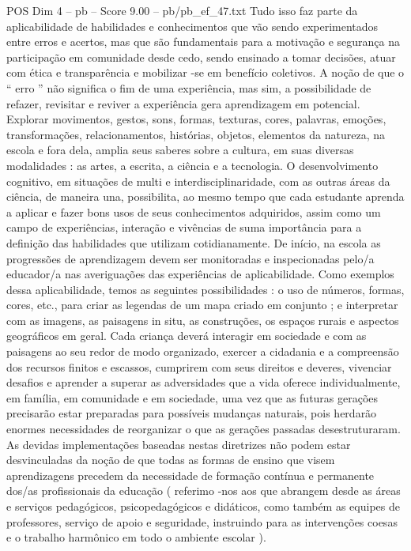 \begin{textsample}{POS Dim 4 – pb – Score 9.00 – pb/pb\_ef\_47.txt}
Tudo isso faz parte da aplicabilidade de habilidades e conhecimentos que vão sendo experimentados entre erros e acertos, mas que são fundamentais para a motivação e segurança na participação em comunidade desde cedo, sendo ensinado a tomar decisões, atuar com ética e transparência e mobilizar -se em benefício coletivos.
A noção de que o “ erro ” não significa o fim de uma experiência, mas sim, a possibilidade de refazer, revisitar e reviver a experiência gera aprendizagem em potencial.
Explorar movimentos, gestos, sons, formas, texturas, cores, palavras, emoções, transformações, relacionamentos, histórias, objetos, elementos da natureza, na escola e fora dela, amplia seus saberes sobre a cultura, em suas diversas modalidades : as artes, a escrita, a ciência e a tecnologia.
O desenvolvimento cognitivo, em situações de multi e interdisciplinaridade, com as outras áreas da ciência, de maneira una, possibilita, ao mesmo tempo que cada estudante aprenda a aplicar e fazer bons usos de seus conhecimentos adquiridos, assim como um campo de experiências, interação e vivências de suma importância para a definição das habilidades que utilizam cotidianamente.
De início, na escola as progressões de aprendizagem devem ser monitoradas e inspecionadas pelo/a educador/a nas averiguações das experiências de aplicabilidade.
Como exemplos dessa aplicabilidade, temos as seguintes possibilidades : o uso de números, formas, cores, etc., para criar as legendas de um mapa criado em conjunto ; e interpretar com as imagens, as paisagens in situ, as construções, os espaços rurais e aspectos geográficos em geral.
Cada criança deverá interagir em sociedade e com as paisagens ao seu redor de modo organizado, exercer a cidadania e a compreensão dos recursos finitos e escassos, cumprirem com seus direitos e deveres, vivenciar desafios e aprender a superar as adversidades que a vida oferece individualmente, em família, em comunidade e em sociedade, uma vez que as futuras gerações precisarão estar preparadas para possíveis mudanças naturais, pois herdarão enormes necessidades de reorganizar o que as gerações passadas desestruturaram.
As devidas implementações baseadas nestas diretrizes não podem estar desvinculadas da noção de que todas as formas de ensino que visem aprendizagens precedem da necessidade de formação contínua e permanente dos/as profissionais da educação ( referimo -nos aos que abrangem desde as áreas e serviços pedagógicos, psicopedagógicos e didáticos, como também as equipes de professores, serviço de apoio e seguridade, instruindo para as intervenções coesas e o trabalho harmônico em todo o ambiente escolar ).

\end{textsample}
